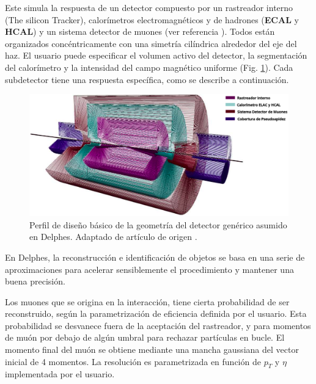 Este simula la respuesta de un detector compuesto por un rastreador interno (The silicon Tracker), calorímetros electromagnéticos y de hadrones (\textbf{ECAL} y \textbf{HCAL}) y un sistema detector de muones (ver referencia \cite{de_favereau_delphes_2014}). Todos están organizados concéntricamente con una simetría cilíndrica alrededor del eje del haz. El usuario puede especificar el volumen activo del detector, la segmentación del calorímetro y la intensidad del campo magnético uniforme (Fig. \ref{delphes}). Cada subdetector tiene una respuesta específica, como se describe a continuación.

\begin{figure}[ht]
    \centering
    \includegraphics[width=1\textwidth]{Analisis_y_Resultados/imagenes/delphes.png}
    \caption{Perfil de diseño básico de la geometría del detector genérico asumido en Delphes. Adaptado de artículo de origen \cite{alwall_automated_2014}.}
    \label{delphes}
\end{figure}

En Delphes, la reconstrucción e identificación de objetos se basa en una serie de aproximaciones para acelerar sensiblemente el procedimiento y mantener una buena precisión. 

Los muones que se origina en la interacción, tiene cierta probabilidad de ser reconstruido, según la parametrización de eficiencia definida por el usuario. Esta probabilidad se desvanece fuera de la aceptación del rastreador, y para momentos de muón por debajo de algún umbral para rechazar partículas en bucle. El momento final del muón se obtiene mediante una mancha gaussiana del vector inicial de 4 momentos. La resolución es parametrizada en función de $p_T$ y $\eta$ implementada por el usuario.


